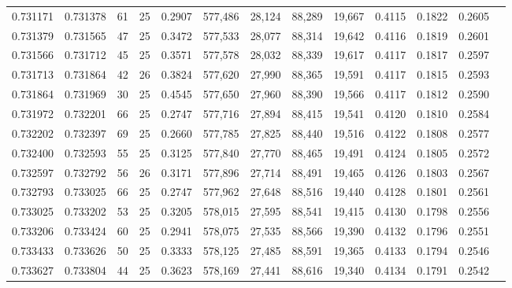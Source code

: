 \begin{tabular}{rrrrrrrrrrrrr}
0.731171 & 0.731378 &    61 &  25 &                                     0.2907 & 577,486 &  28,124 &  88,289 &  19,667 & 0.4115 & 0.1822 & 0.2605 \\
0.731379 & 0.731565 &    47 &  25 &                                     0.3472 & 577,533 &  28,077 &  88,314 &  19,642 & 0.4116 & 0.1819 & 0.2601 \\
0.731566 & 0.731712 &    45 &  25 &                                     0.3571 & 577,578 &  28,032 &  88,339 &  19,617 & 0.4117 & 0.1817 & 0.2597 \\
0.731713 & 0.731864 &    42 &  26 &                                     0.3824 & 577,620 &  27,990 &  88,365 &  19,591 & 0.4117 & 0.1815 & 0.2593 \\
0.731864 & 0.731969 &    30 &  25 &                                     0.4545 & 577,650 &  27,960 &  88,390 &  19,566 & 0.4117 & 0.1812 & 0.2590 \\
0.731972 & 0.732201 &    66 &  25 &                                     0.2747 & 577,716 &  27,894 &  88,415 &  19,541 & 0.4120 & 0.1810 & 0.2584 \\
0.732202 & 0.732397 &    69 &  25 &                                     0.2660 & 577,785 &  27,825 &  88,440 &  19,516 & 0.4122 & 0.1808 & 0.2577 \\
0.732400 & 0.732593 &    55 &  25 &                                     0.3125 & 577,840 &  27,770 &  88,465 &  19,491 & 0.4124 & 0.1805 & 0.2572 \\
0.732597 & 0.732792 &    56 &  26 &                                     0.3171 & 577,896 &  27,714 &  88,491 &  19,465 & 0.4126 & 0.1803 & 0.2567 \\
0.732793 & 0.733025 &    66 &  25 &                                     0.2747 & 577,962 &  27,648 &  88,516 &  19,440 & 0.4128 & 0.1801 & 0.2561 \\
0.733025 & 0.733202 &    53 &  25 &                                     0.3205 & 578,015 &  27,595 &  88,541 &  19,415 & 0.4130 & 0.1798 & 0.2556 \\
0.733206 & 0.733424 &    60 &  25 &                                     0.2941 & 578,075 &  27,535 &  88,566 &  19,390 & 0.4132 & 0.1796 & 0.2551 \\
0.733433 & 0.733626 &    50 &  25 &                                     0.3333 & 578,125 &  27,485 &  88,591 &  19,365 & 0.4133 & 0.1794 & 0.2546 \\
0.733627 & 0.733804 &    44 &  25 &                                     0.3623 & 578,169 &  27,441 &  88,616 &  19,340 & 0.4134 & 0.1791 & 0.2542 \\

\end{tabular}
